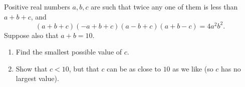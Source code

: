 Positive real numbers $a,b,c$ are such that twice any one of them is less than $a+b+c$, and
\[(a+b+c)(-a+b+c)(a-b+c)(a+b-c)=4a^2b^2.\]
Suppose also that $a+b=10$.
\begin{enumerate}
\item[(a)] Find the smallest possible value of $c$.
\item[(b)] Show that $c<10$, but that $c$ can be as close to $10$ as we like (so $c$ has no largest value).
\end{enumerate}
